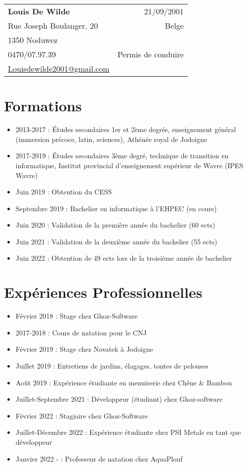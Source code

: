 \documentclass[a4paper,12pt]{article}
\begin{document}
    \noindent
    \begin{tabular*}{\textwidth}{@{\extracolsep{\fill}}lr}
        \textbf{Louis De Wilde} & 21/09/2001\\
        Rue Joseph Boulanger, 20 & Belge\\
        1350 Noduwez & \\
        0470/07.97.39 & Permis de conduire\\
        \href{mailto:Louisdewilde2001@gmail.com}{Louisdewilde2001@gmail.com} & \\
    \end{tabular*}

    \section*{Formations}
    \begin{itemize}[noitemsep]
        \item 2013-2017 : Études secondaires 1er et 2ème degrés, enseignement général (immersion précoce, latin, sciences), Athénée royal de Jodoigne
        \item 2017-2019 : Études secondaires 3ème degré, technique de transition en informatique, Institut provincial d’enseignement supérieur de Wavre (IPES Wavre)
        \item Juin 2019 : Obtention du CESS
        \item Septembre 2019 : Bachelier en informatique à l'EHPEC (en cours)
        \item Juin 2020 : Validation de la première année du bachelier (60 ects)
        \item Juin 2021 : Validation de la deuxième année du bachelier (55 ects)
        \item Juin 2022 : Obtention de 49 ects lors de la troisième année de bachelier
    \end{itemize}

    \section*{Expériences Professionnelles}
    \begin{itemize}[noitemsep]
        \item Février 2018 : Stage chez Ghoz-Software
        \item 2017-2018 : Cours de natation pour le CNJ
        \item Février 2019 : Stage chez Novatek à Jodoigne
        \item Juillet 2019 : Entretiens de jardins, élagages, tontes de pelouses
        \item Août 2019 : Expérience étudiante en menuiserie chez Chêne \& Bambou
        \item Juillet-Septembre 2021 : Développeur (étudiant) chez Ghoz-software
        \item Février 2022 : Stagiaire chez Ghoz-Software
        \item Juillet-Décembre 2022 : Expérience étudiante chez PSI Metals en tant que développeur
        \item Janvier 2022 - : Professeur de natation chez AquaPlouf
    \end{itemize}
\end{document}
